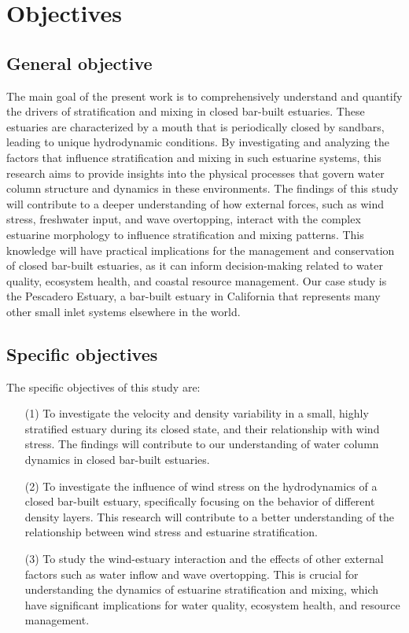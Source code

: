 \documentclass[tesis.tex]{subfiles}
\begin{document}
\section{Objectives}

\subsection{General objective}

The main goal of the present work is to comprehensively understand and quantify the drivers of stratification and mixing in closed bar-built estuaries. These estuaries are characterized by a mouth that is periodically closed by sandbars, leading to unique hydrodynamic conditions. By investigating and analyzing the factors that influence stratification and mixing in such estuarine systems, this research aims to provide insights into the physical processes that govern water column structure and dynamics in these environments. The findings of this study will contribute to a deeper understanding of how external forces, such as wind stress, freshwater input, and wave overtopping, interact with the complex estuarine morphology to influence stratification and mixing patterns. This knowledge will have practical implications for the management and conservation of closed bar-built estuaries, as it can inform decision-making related to water quality, ecosystem health, and coastal resource management. Our case study is the Pescadero Estuary, a bar-built estuary in California that represents many other small inlet systems elsewhere in the world. \\

\subsection{Specific objectives}

The specific objectives of this study are:
\begin{enumerate}
    \item [(1)]  To investigate the velocity and density variability in a small, highly stratified estuary during its closed state, and their relationship with wind stress. The findings will contribute to our understanding of water column dynamics in closed bar-built estuaries.
    \item [(2)] To investigate the influence of wind stress on the hydrodynamics of a closed bar-built estuary, specifically focusing on the behavior of different density layers. This research will contribute to a better understanding of the relationship between wind stress and estuarine stratification.
    \item [(3)] To study the wind-estuary interaction and the effects of other external factors such as water inflow and wave overtopping. This is crucial for understanding the dynamics of estuarine stratification and mixing, which have significant implications for water quality, ecosystem health, and resource management.
\end{enumerate}
\end{document}
